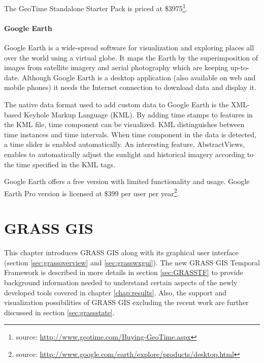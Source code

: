 \documentclass[a4paper,12pt,oneside]{book}
\newcommand{\tf}{Temporal Framework\xspace}
\begin{document}
The GeoTime Standalone Starter Pack is priced at \$3975\footnote{source:
\url{http://www.geotime.com/Buying-GeoTime.aspx}}.



\subsubsection{Google Earth}
Google Earth is a wide-spread software for visualization and exploring places all over the world
using a virtual globe.  It maps the Earth by the superimposition of images
 from satellite imagery and aerial photography which are keeping up-to-date.
Although Google Earth is a desktop application (also available on web and mobile phones) it needs
the Internet connection to download data and display it.

The native data format used to add custom data to Google Earth is the XML-based Keyhole Markup Language (KML).
By adding time stamps to features in the KML file, time component can be visualized. KML distinguishes
between time instances and time intervals. When time component in the data is detected,
a time slider is enabled automatically. An interesting feature, AbstractViews, enables to automatically
adjust the sunlight and historical imagery according to the time specified in the KML tags.

Google Earth offers a free version with limited functionality and usage.
Google Earth Pro version is licensed at \$399 per user per
year\footnote{source: \url{http://www.google.com/earth/explore/products/desktop.html}}.




\chapter{GRASS GIS}
\label{chap:grass}

This chapter introduces GRASS GIS along with its graphical user interface
(section \ref{sec:grassoverview} and \ref{sec:grasswxgui}).
The new GRASS GIS \tf is described in more details in section \ref{sec:GRASSTF}
to provide background information needed
to understand certain aspects of the newly developed tools covered in chapter \ref{chap:results}.
Also, the support and visualization possibilities of GRASS GIS excluding
the recent work are further discussed in section \ref{sec:grassstate}.
\end{document}
